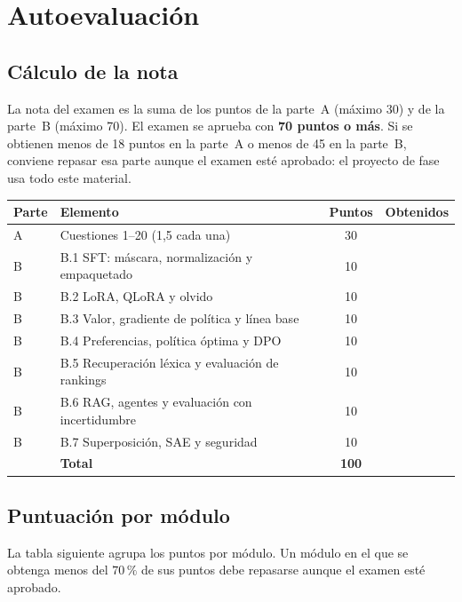 \chapter{Autoevaluación}
\label{ap:autoevaluacion}

\section{Cálculo de la nota}

La nota del examen es la suma de los puntos de la parte~A (máximo 30) y de la parte~B (máximo 70). El examen se aprueba con \textbf{70 puntos o más}. Si se obtienen menos de 18 puntos en la parte~A o menos de 45 en la parte~B, conviene repasar esa parte aunque el examen esté aprobado: el proyecto de fase usa todo este material.

\begin{center}
\begin{tabular}{@{}llcc@{}}
\toprule
Parte & Elemento & Puntos & Obtenidos \\
\midrule
A & Cuestiones 1--20 (1,5 cada una) & 30 & \\
\midrule
B & B.1 SFT: máscara, normalización y empaquetado & 10 & \\
B & B.2 LoRA, QLoRA y olvido & 10 & \\
B & B.3 Valor, gradiente de política y línea base & 10 & \\
B & B.4 Preferencias, política óptima y DPO & 10 & \\
B & B.5 Recuperación léxica y evaluación de rankings & 10 & \\
B & B.6 RAG, agentes y evaluación con incertidumbre & 10 & \\
B & B.7 Superposición, SAE y seguridad & 10 & \\
\midrule
 & \textbf{Total} & \textbf{100} & \\
\bottomrule
\end{tabular}
\end{center}

\section{Puntuación por módulo}

La tabla siguiente agrupa los puntos por módulo. Un módulo en el que se obtenga menos del $70\,\%$ de sus puntos debe repasarse aunque el examen esté aprobado.

